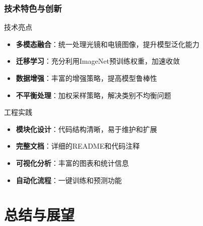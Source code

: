 \documentclass[12pt]{beamer}
\begin{document}
\begin{frame}
\frametitle{技术特色与创新}
\begin{block}{技术亮点}
\begin{itemize}
    \item \textbf{多模态融合}：统一处理光镜和电镜图像，提升模型泛化能力
    \item \textbf{迁移学习}：充分利用ImageNet预训练权重，加速收敛
    \item \textbf{数据增强}：丰富的增强策略，提高模型鲁棒性
    \item \textbf{不平衡处理}：加权采样策略，解决类别不均衡问题
\end{itemize}
\end{block}

\begin{block}{工程实践}
\begin{itemize}
    \item \textbf{模块化设计}：代码结构清晰，易于维护和扩展
    \item \textbf{完整文档}：详细的README和代码注释
    \item \textbf{可视化分析}：丰富的图表和统计信息
    \item \textbf{自动化流程}：一键训练和预测功能
\end{itemize}
\end{block}
\end{frame}

\section{总结与展望}
\end{document}
